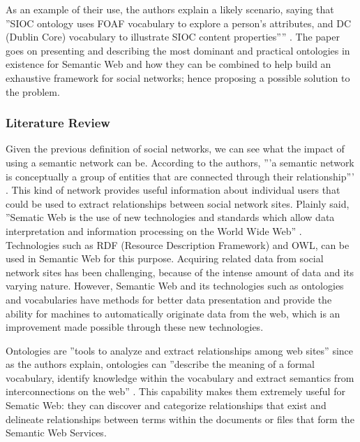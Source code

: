 \documentclass[10pt,journal,compsoc]{IEEEtran}
\begin{document}
As an example of their use, the authors explain a likely scenario, saying that ''SIOC ontology uses FOAF vocabulary to explore a person’s attributes, and DC (Dublin Core) vocabulary to illustrate SIOC content properties”'' \cite{6190504}. The paper goes on presenting and describing the most dominant and practical ontologies in existence for Semantic Web and how they can be combined to help build an exhaustive framework for social networks; hence proposing a possible solution to the problem.

\subsubsection{Literature Review}
Given the previous definition of social networks, we can see what the impact of using a semantic network can be. According to the authors, '''a semantic network is conceptually a group of entities that are connected through their relationship''' \cite{6190504}. This kind of network provides useful information about individual users that could be used to extract relationships between social network sites. Plainly said, ''Sematic Web is the use of new technologies and standards which allow data interpretation and information processing on the World Wide Web'' \cite{6190504}. Technologies such as RDF (Resource Description Framework) and OWL, can be used in Semantic Web for this purpose. Acquiring related data from social network sites has been challenging, because of the intense amount of data and its varying nature. However, Semantic Web and its technologies such as ontologies and vocabularies have methods for better data presentation and provide the ability for machines to automatically originate data from the web, which is an improvement made possible through these new technologies.






Ontologies are ''tools to analyze and extract relationships among web sites'' \cite{6190504} since as the authors explain, ontologies can ''describe the meaning of a formal vocabulary, identify knowledge within the vocabulary and extract semantics from interconnections on the web'' \cite{6190504}. This capability makes them extremely useful for Sematic Web: they can discover and categorize relationships that exist and delineate relationships between terms within the documents or files that form the Semantic Web Services. 
\end{document}
